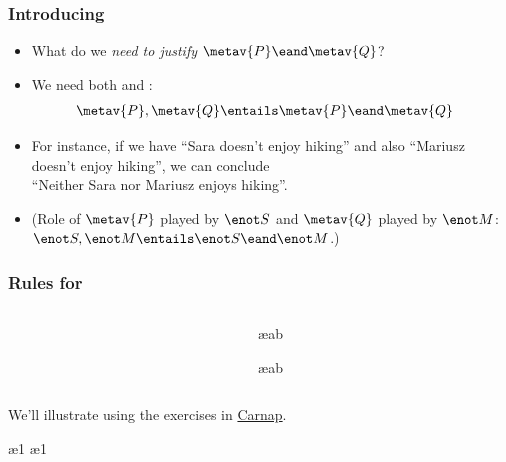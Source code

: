 \begin{frame}
  \frametitle{Introducing \eand}

  \begin{itemize}[<+->]
    \item What do we \emph{need to justify} $\metav{P} \eand \metav{Q}$?
    \item We need both  and :
    \begin{align*}
      & \metav{P}, \metav{Q} \entails \metav{P}\eand \metav{Q}
    \end{align*}
    \item For instance, if we have ``Sara doesn't enjoy hiking'' and
    also ``Mariusz doesn't enjoy hiking'', we can conclude\\
    ``Neither
    Sara nor Mariusz enjoys hiking''.
    \item (Role of $\metav{P}$ played by $\enot S$ and $\metav{Q}$
    played by $\enot M$: $\enot S, \enot M \entails \enot S \eand
    \enot M$.)
  \end{itemize}
\end{frame}

\begin{frame}
  \frametitle{Rules for \eand}
  \begin{columns}
    \begin{column}{3cm}
  \begin{fitchproof}
     
  \end{fitchproof}
\end{column}
\begin{column}{3cm}
  \begin{fitchproof}
     \ae{ab}
  \end{fitchproof}
  \begin{fitchproof}
     \ae{ab}
  \end{fitchproof}
\end{column}
\end{columns}
We'll illustrate using the exercises in \href{https://carnap.io/shared/rzach@ucalgary.ca/Practice\%20Problems\%20IV.md}{Carnap}.
\end{frame}

\begin{frame}
  \begin{fitchproof}
    \ae{1}
    \ae{1}
  \end{fitchproof}
\end{frame}

